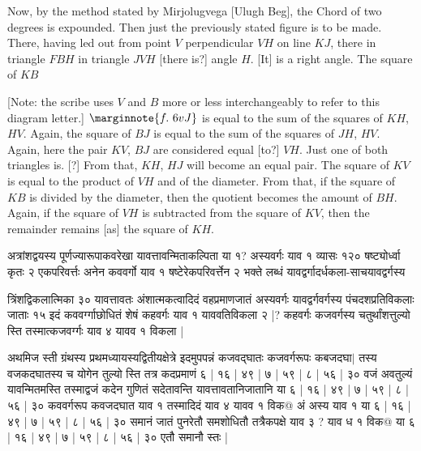 \documentclass[12pt]{book}
\begin{document}
\newpage

Now, by the method stated by Mirjolugvega [Ulugh Beg], the Chord of two degrees is expounded. 
Then just the previously stated figure is to be made. \\ 

\iffalse
\begin{center}
\texttt{[image: 6r.png]}
\captionof{figure}{6r}
\end{center}
\fi 

There, having led out from point $V$ perpendicular $VH$ on line $KJ$, there in triangle
$FBH$ in triangle $JVH$ [there is?] angle $H$. [It] is a right angle. The square of $KB$ 

[Note: the scribe uses $V$ and $B$ more or less interchangeably to refer to this 
diagram letter.]
$\marginnote{f.~6v J}$
is equal to the sum of the squares of $KH$, $HV$. Again, the square of $BJ$ is equal to the
sum of the squares of $JH$, $HV$. Again, here the pair $KV$, $BJ$ are considered equal 
[to?] $VH$. Just one of both triangles is.  [?] From that, $KH$, $HJ$ will become an equal pair.
The square of $KV$ is equal to the product of $VH$ and of the diameter. From that, if the 
square of $KB$ is divided by the diameter, then the quotient becomes the amount of $BH$.
Again, if the square of $VH$ is subtracted from the square of $KV$, then the remainder
remains [as] the square of $KH$.  


\newpage

{\s अत्रांशद्वयस्य पूर्णज्यारूपाकवरेखा
यावत्तावन्मिताकल्पिता या १? अस्यवर्गः
याव १ व्यासः १२० षष्ट्योर्ध्वा कृतः २ एकपरिवर्त्तः अनेन कववर्गो याव १ षष्टेरेकपरिवर्त्तेन २ भक्ते लब्धं
यावद्वर्गादर्धकला-साचयावद्वर्गस्य 

त्रिंशद्विकलात्मिका ३०
यावत्तावतः अंशात्मकत्वादिदं वहप्रमाणजातं अस्यवर्गः यावद्वर्गवर्गस्य
पंचदशप्रतिविकलाः जाताः १५ इदं कववर्ग्गाछोधितं शेषं कहवर्गः याव १ याववतिविकला २ |? कहवर्गः कजवर्गस्य चतुर्थांशत्तुल्यो स्ति तस्मात्कजवर्ग्गः याव ४ यावव १
विकला |

अथमिज स्ती ग्रंथस्य प्रथमध्यायस्यद्वितीयक्षेत्रे इदमुपपन्नं कजवद्घातः कजवर्गरूपः
कबजदघा$|$
तस्य वजकदघातस्य च योगेन तुल्यो स्ति तत्र कदप्रमाणं ६ | १६ | ४९ | ७ | ५९ | ८ | ५६ | ३० वजं अवतुल्यं
यावन्मितमस्ति तस्माद्वजं कदेन गुणितं सदेतावन्ति यावत्तावतानिजातानि या ६ | १६ | ४९ | ७ | ५९ | ८ | ५६ | ३० कववर्गरूप कवजदघात याव १
तस्मादिदं याव ४ यावव १ विक@ अं अस्य याव १ या ६ | १६ | ४९ | ७ | ५९ | ८ | ५६ | ३० समानं जातं पुनरेतौ समशोधितौ तत्रैकपक्षे
याव ३ ? याव ध १ विक@ 
या ६ | १६ | ४९ | ७ | ५९ | ८ | ५६ | ३० एतौ समानौ स्तः |} 
\end{document}
